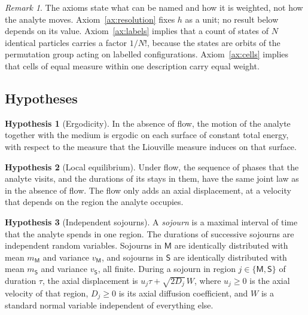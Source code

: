 \documentclass[11pt,a4paper]{article}
\theoremstyle{definition}
\newtheorem{hypothesis}{Hypothesis}
\theoremstyle{remark}
\newtheorem{remark}[theorem]{Remark}
\newcommand{\Mob}{\mathsf{M}}
\newcommand{\Sta}{\mathsf{S}}
\begin{document}
\begin{remark}
\label{rem:axioms}
The axioms state what can be named and how it is weighted, not how the analyte moves.
Axiom~\ref{ax:resolution} fixes $h$ as a unit; no result below depends on its value.
Axiom~\ref{ax:labels} implies that a count of states of $N$ identical particles carries a factor $1/N!$, because the states are orbits of the permutation group acting on labelled configurations.
Axiom~\ref{ax:cells} implies that cells of equal measure within one description carry equal weight.
\end{remark}

\subsection{Hypotheses}

\begin{hypothesis}[Ergodicity]
\label{hyp:ergodic}
In the absence of flow, the motion of the analyte together with the medium is ergodic on each surface of constant total energy, with respect to the measure that the Liouville measure induces on that surface.
\end{hypothesis}

\begin{hypothesis}[Local equilibrium]
\label{hyp:local}
Under flow, the sequence of phases that the analyte visits, and the durations of its stays in them, have the same joint law as in the absence of flow.
The flow only adds an axial displacement, at a velocity that depends on the region the analyte occupies.
\end{hypothesis}

\begin{hypothesis}[Independent sojourns]
\label{hyp:renewal}
A \emph{sojourn} is a maximal interval of time that the analyte spends in one region.
The durations of successive sojourns are independent random variables.
Sojourns in $\Mob$ are identically distributed with mean $m_\Mob$ and variance $v_\Mob$, and sojourns in $\Sta$ are identically distributed with mean $m_\Sta$ and variance $v_\Sta$, all finite.
During a sojourn in region $j\in\{\Mob,\Sta\}$ of duration $\tau$, the axial displacement is $u_j\tau+\sqrt{2D_j}\,W$, where $u_j\ge0$ is the axial velocity of that region, $D_j\ge0$ is its axial diffusion coefficient, and $W$ is a standard normal variable independent of everything else.
\end{hypothesis}
\end{document}
